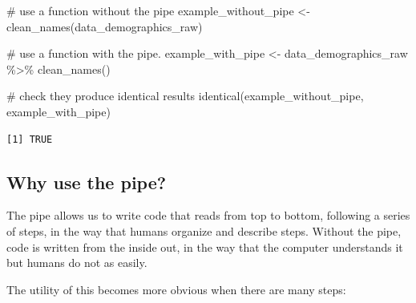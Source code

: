 \documentclass[
  letterpaper,
  DIV=11,
  numbers=noendperiod]{scrreprt}
\newenvironment{Shaded}{\begin{snugshade}}{\end{snugshade}}
\newcommand{\CommentTok}[1]{\textcolor[rgb]{0.37,0.37,0.37}{#1}}
\newcommand{\FunctionTok}[1]{\textcolor[rgb]{0.28,0.35,0.67}{#1}}
\newcommand{\NormalTok}[1]{\textcolor[rgb]{0.00,0.23,0.31}{#1}}
\newcommand{\OtherTok}[1]{\textcolor[rgb]{0.00,0.23,0.31}{#1}}
\newcommand{\SpecialCharTok}[1]{\textcolor[rgb]{0.37,0.37,0.37}{#1}}
\begin{document}
\begin{Shaded}
\begin{Highlighting}[]
\CommentTok{\# use a function without the pipe}
\NormalTok{example\_without\_pipe }\OtherTok{\textless{}{-}} \FunctionTok{clean\_names}\NormalTok{(data\_demographics\_raw)}

\CommentTok{\# use a function with the pipe. }
\NormalTok{example\_with\_pipe }\OtherTok{\textless{}{-}}\NormalTok{ data\_demographics\_raw }\SpecialCharTok{\%\textgreater{}\%}
  \FunctionTok{clean\_names}\NormalTok{()}

\CommentTok{\# check they produce identical results}
\FunctionTok{identical}\NormalTok{(example\_without\_pipe, example\_with\_pipe)}
\end{Highlighting}
\end{Shaded}

\begin{verbatim}
[1] TRUE
\end{verbatim}

\subsection{Why use the pipe?}\label{why-use-the-pipe}

The pipe allows us to write code that reads from top to bottom,
following a series of steps, in the way that humans organize and
describe steps. Without the pipe, code is written from the inside out,
in the way that the computer understands it but humans do not as easily.

The utility of this becomes more obvious when there are many steps:
\end{document}
